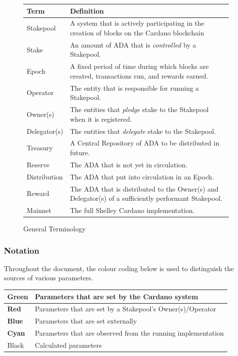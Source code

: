 \documentclass[11pt,a4paper,dvipsnames,twosided,final]{article}
\newcommand{\ada}{ADA{}}
\newcommand{\cardano}[1]{Cardano}
\begin{document}
\begin{figure}[t]
  \begin{center}
\begin{tabular}{||l|p{12cm}||}
  \hline \hline
\textbf{Term} & \textbf{Definition} \\\hline
  Stakepool & A system that is actively participating in the creation of blocks on the \cardano{} blockchain  \\\hline
  Stake & An amount of \ada{} that is \emph{controlled} by a Stakepool.\\\hline
  Epoch & A fixed period of time during which blocks are created, transactions run, and rewards earned.\\\hline
Operator & The entity that is responsible for running a Stakepool. \\\hline
Owner(s) & The entities that \emph{pledge} stake to the Stakepool when it is registered. \\\hline
  Delegator(s) & The entities that \emph{delegate} stake to the Stakepool.\\\hline
  Treasury & A Central Repository of \ada{} to be distributed in future.\\\hline
  Reserve & The \ada{} that is not yet in circulation.\\\hline
  Distribution & The \ada{} that put into circulation in an Epoch.\\\hline
  Reward & The \ada{} that is distributed to the Owner(s) and Delegator(s) of a sufficiently performant Stakepool.\\\hline
  Mainnet & The full Shelley \cardano{} implementation.\\\hline
  \hline
\end{tabular}
\end{center}
\caption{General Terminology}
\label{fig:terminology}
\end{figure}

\newpage
\subsubsection*{Notation}

Throughout the document, the colour coding below is used to distinguish the sources of various parameters.

\begin{tabular}{||l|l||}\hline\hline
  \textbf{\color{green} Green} & Parameters that are set by the \cardano{} system \\\hline
  \textbf{\color{red} Red} & Parameters that are set by a Stakepool's Owner(s)/Operator \\\hline
  \textbf{\color{blue} Blue} & Parameters that are set externally \\\hline
  \textbf{\color{cyan} Cyan} & Parameters that are observed from the running implementation \\\hline
  Black & Calculated parameters \\\hline
\hline
\end{tabular}
\end{document}
